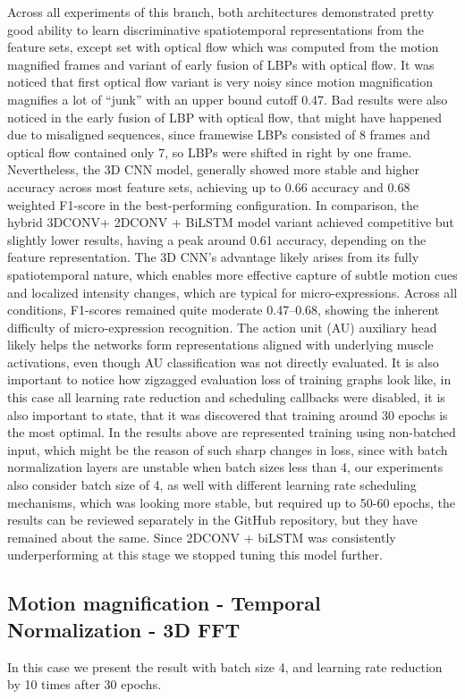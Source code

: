 \documentclass{article}
\begin{document}
Across all experiments of this branch, both architectures demonstrated pretty good ability to learn discriminative spatiotemporal representations from the feature sets, except set with optical flow which was computed from the motion magnified frames and variant of early fusion of LBPs with optical flow. It was noticed that first optical flow variant is very noisy since motion magnification magnifies a lot of “junk” with an upper bound cutoff 0.47. Bad results were also noticed in the early fusion of LBP with optical flow, that might have happened due to misaligned sequences, since framewise LBPs consisted of 8 frames and optical flow contained only 7, so LBPs were shifted in right by one frame. Nevertheless, the 3D CNN model, generally showed more stable and higher accuracy across most feature sets, achieving up to 0.66 accuracy and 0.68 weighted F1-score in the best-performing configuration. In comparison, the hybrid 3DCONV+ 2DCONV + BiLSTM model variant achieved competitive but slightly lower results, having a peak around 0.61 accuracy, depending on the feature representation. The 3D CNN’s advantage likely arises from its fully spatiotemporal nature, which enables more effective capture of subtle motion cues and localized intensity changes, which are typical for micro-expressions. Across all conditions, F1-scores remained quite moderate 0.47–0.68, showing the inherent difficulty of micro-expression recognition. The action unit (AU) auxiliary head likely helps the networks form representations aligned with underlying muscle activations, even though AU classification was not directly evaluated. It is also important to notice how zigzagged evaluation loss of training graphs look like, in this case all learning rate reduction and scheduling callbacks were disabled, it is also important to state, that it was discovered that training around 30 epochs is the most optimal. In the results above are represented training using non-batched input, which might be the reason of such sharp changes in loss, since with batch normalization layers are unstable when batch sizes less than 4, our experiments also consider batch size of 4, as well with different learning rate scheduling mechanisms, which was looking more stable, but required up to 50-60 epochs, the results can be reviewed separately in the GitHub repository, but they have remained about the same. Since 2DCONV + biLSTM was consistently underperforming at this stage we stopped tuning this model further.

\subsection{Motion magnification - Temporal Normalization - 3D FFT}
In this case we present the result with batch size 4, and learning rate reduction by 10 times after 30 epochs.
\end{document}
